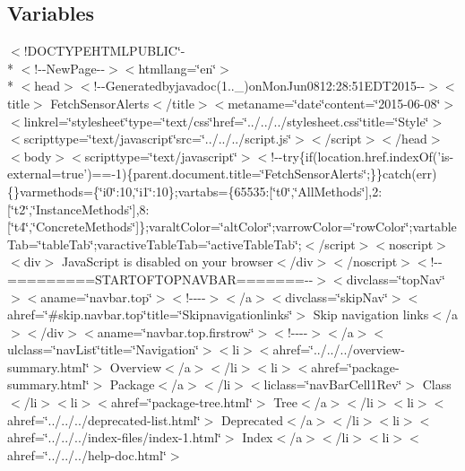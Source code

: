 \subsection*{Variables}
\begin{DoxyCompactItemize}
\item 
$<$!D\-O\-C\-T\-Y\-P\-E\-H\-T\-M\-L\-P\-U\-B\-L\-I\-C\char`\"{}-\/\\*
$<$!-\/-\/New\-Page-\/-\/$>$$<$htmllang=\char`\"{}en\char`\"{}$>$\\*
$<$head$>$$<$!-\/-\/Generatedbyjavadoc(1..\-\_)on\-Mon\-Jun0812\-:28\-:51\-E\-D\-T2015-\/-\/$>$$<$title$>$ Fetch\-Sensor\-Alerts$<$/title$>$$<$metaname=\char`\"{}date\char`\"{}content=\char`\"{}2015-\/06-\/08\char`\"{}$>$$<$linkrel=\char`\"{}stylesheet\char`\"{}type=\char`\"{}text/css\char`\"{}href=\char`\"{}../../../stylesheet.\-css\char`\"{}title=\char`\"{}\-Style\char`\"{}$>$$<$scripttype=\char`\"{}text/javascript\char`\"{}src=\char`\"{}../../../script.\-js\char`\"{}$>$$<$/script$>$$<$/head$>$$<$body$>$$<$scripttype=\char`\"{}text/javascript\char`\"{}$>$$<$!-\/-\/try\{if(location.\-href.\-index\-Of('is-\/external=true')==-\/1)\{parent.\-document.\-title=\char`\"{}\-Fetch\-Sensor\-Alerts\char`\"{};\}\}catch(err)\{\}varmethods=\{\char`\"{}i0\char`\"{}\-:10,\char`\"{}i1\char`\"{}\-:10\};vartabs=\{65535\-:\mbox{[}\char`\"{}t0\char`\"{},\char`\"{}\-All\-Methods\char`\"{}\mbox{]},2\-:\mbox{[}\char`\"{}t2\char`\"{},\char`\"{}\-Instance\-Methods\char`\"{}\mbox{]},8\-:\mbox{[}\char`\"{}t4\char`\"{},\char`\"{}\-Concrete\-Methods\char`\"{}\mbox{]}\};varalt\-Color=\char`\"{}alt\-Color\char`\"{};varrow\-Color=\char`\"{}row\-Color\char`\"{};vartable\-Tab=\char`\"{}table\-Tab\char`\"{};varactive\-Table\-Tab=\char`\"{}active\-Table\-Tab\char`\"{};$<$/script$>$$<$noscript$>$$<$div$>$ Java\-Script is disabled on your browser$<$/div$>$$<$/noscript$>$$<$!-\/-\/=========\-S\-T\-A\-R\-T\-O\-F\-T\-O\-P\-N\-A\-V\-B\-A\-R=======-\/-\/$>$$<$divclass=\char`\"{}top\-Nav\char`\"{}$>$$<$aname=\char`\"{}navbar.\-top\char`\"{}$>$$<$!-\/-\/-\/-\/$>$$<$/a$>$$<$divclass=\char`\"{}skip\-Nav\char`\"{}$>$$<$ahref=\char`\"{}\#skip.\-navbar.\-top\char`\"{}title=\char`\"{}\-Skipnavigationlinks\char`\"{}$>$ Skip navigation links$<$/a$>$$<$/div$>$$<$aname=\char`\"{}navbar.\-top.\-firstrow\char`\"{}$>$$<$!-\/-\/-\/-\/$>$$<$/a$>$$<$ulclass=\char`\"{}nav\-List\char`\"{}title=\char`\"{}\-Navigation\char`\"{}$>$$<$li$>$$<$ahref=\char`\"{}../../../overview-\/summary.\-html\char`\"{}$>$ Overview$<$/a$>$$<$/li$>$$<$li$>$$<$ahref=\char`\"{}package-\/summary.\-html\char`\"{}$>$ Package$<$/a$>$$<$/li$>$$<$liclass=\char`\"{}nav\-Bar\-Cell1\-Rev\char`\"{}$>$ Class$<$/li$>$$<$li$>$$<$ahref=\char`\"{}package-\/tree.\-html\char`\"{}$>$ Tree$<$/a$>$$<$/li$>$$<$li$>$$<$ahref=\char`\"{}../../../deprecated-\/list.\-html\char`\"{}$>$ Deprecated$<$/a$>$$<$/li$>$$<$li$>$$<$ahref=\char`\"{}../../../index-\/files/index-\/1.\-html\char`\"{}$>$ Index$<$/a$>$$<$/li$>$$<$li$>$$<$ahref=\char`\"{}../../../help-\/doc.\-html\char`\"{}$>$ $$
\end{DoxyCompactItemize}
